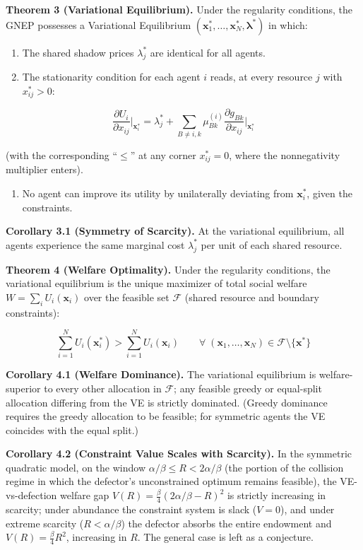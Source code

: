 \documentclass[11pt]{article}
\providecommand{\tightlist}{%
  \setlength{\itemsep}{0pt}\setlength{\parskip}{0pt}}
\begin{document}
\textbf{Theorem 3 (Variational Equilibrium).} Under the regularity
conditions, the GNEP possesses a Variational Equilibrium
\((\mathbf{x}_1^*, \ldots, \mathbf{x}_N^*, \boldsymbol{\lambda}^*)\) in
which:

\begin{enumerate}
\def\labelenumi{(\alph{enumi})}
\item
  The shared shadow prices \(\lambda_j^*\) are identical for all agents.
\item
  The stationarity condition for each agent \(i\) reads, at every
  resource \(j\) with \(x_{ij}^* > 0\):
\end{enumerate}

\[\frac{\partial U_i}{\partial x_{ij}}\bigg|_{\mathbf{x}_i^*} = \lambda_j^* + \sum_{B \neq i, k} \mu_{Bk}^{(i)} \frac{\partial g_{Bk}}{\partial x_{ij}}\bigg|_{\mathbf{x}_i^*}\]

(with the corresponding ``\(\leq\)'' at any corner \(x_{ij}^* = 0\),
where the nonnegativity multiplier enters).

\begin{enumerate}
\def\labelenumi{(\alph{enumi})}
\setcounter{enumi}{2}
\tightlist
\item
  No agent can improve its utility by unilaterally deviating from
  \(\mathbf{x}_i^*\), given the constraints.
\end{enumerate}

\textbf{Corollary 3.1 (Symmetry of Scarcity).} At the variational
equilibrium, all agents experience the same marginal cost
\(\lambda_j^*\) per unit of each shared resource.

\textbf{Theorem 4 (Welfare Optimality).} Under the regularity
conditions, the variational equilibrium is the unique maximizer of total
social welfare \(W = \sum_i U_i(\mathbf{x}_i)\) over the feasible set
\(\mathcal{F}\) (shared resource and boundary constraints):

\[\sum_{i=1}^{N} U_i(\mathbf{x}_i^*) > \sum_{i=1}^{N} U_i(\mathbf{x}_i) \qquad \forall \; (\mathbf{x}_1, \ldots, \mathbf{x}_N) \in \mathcal{F} \setminus \{\mathbf{x}^*\}\]

\textbf{Corollary 4.1 (Welfare Dominance).} The variational equilibrium
is welfare-superior to every other allocation in \(\mathcal{F}\); any
feasible greedy or equal-split allocation differing from the VE is
strictly dominated. (Greedy dominance requires the greedy allocation to
be feasible; for symmetric agents the VE coincides with the equal
split.)

\textbf{Corollary 4.2 (Constraint Value Scales with Scarcity).} In the
symmetric quadratic model, on the window
\(\alpha/\beta \leq R < 2\alpha/\beta\) (the portion of the collision
regime in which the defector's unconstrained optimum remains feasible),
the VE-vs-defection welfare gap
\(V(R) = \tfrac{\beta}{4}(2\alpha/\beta - R)^2\) is strictly increasing
in scarcity; under abundance the constraint system is slack (\(V = 0\)),
and under extreme scarcity (\(R < \alpha/\beta\)) the defector absorbs
the entire endowment and \(V(R) = \tfrac{\beta}{4}R^2\), increasing in
\(R\). The general case is left as a conjecture.
\end{document}
